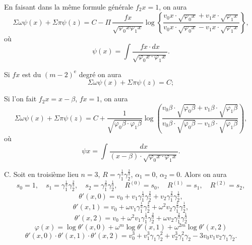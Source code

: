 \documentclass{article}
\begin{document}
En faisant dans la même formule générale $f_2 x = 1$, on aura
\[ \Sigma\omega\psi(x)+\Sigma\pi\psi(z) = C-\Pi\,\frac{f x}{\sqrt{\varphi_0 x\varphi_1 x}}\log\left\{\frac{v_0 x \cdot \sqrt{\varphi_0 x}+v_1 x \cdot \sqrt{\varphi_1 x}}{v_0 x \cdot \sqrt{\varphi_0 x}-v_1 x \cdot \sqrt{\varphi_1 x}}\right\}, \]
où
\[ \psi(x) = \int \frac{f x \cdot dx}{\sqrt{\varphi_0 x \cdot \varphi_1 x}}. \]

Si $f x$ est du $(m-2)^{\text{e}}$ degré on aura
\[ \Sigma\omega\psi(x)+\Sigma\pi\psi(z) = C; \]

Si l'on fait $f_2 x = x-\beta$, $f x = 1$, on aura
\[ \Sigma\omega\psi(x)+\Sigma\pi\psi(z) = C+\frac{1}{\sqrt{\varphi_0\beta \cdot \varphi_1\beta}}\log\left(\frac{v_0\beta \cdot \sqrt{\varphi_0\beta}+v_1\beta \cdot \sqrt{\varphi_1\beta}}{v_0\beta \cdot \sqrt{\varphi_0\beta}-v_1\beta \cdot \sqrt{\varphi_1\beta}}\right), \]
où
\[ \psi x = \int \frac{dx}{(x-\beta) \cdot \sqrt{\varphi_0 x \cdot \varphi_1 x}}. \]

C. Soit en troisième lieu $n = 3$, $R = \gamma_1^{\frac{1}{3}}\gamma_2^{\frac{2}{3}}$, $\alpha_1 = 0$, $\alpha_2 = 0$.
Alors on aura
\[ s_0 = 1, \quad s_1 = \gamma_1^{\frac{1}{3}}\gamma_2^{\frac{2}{3}}, \quad s_2 = \gamma_1^{\frac{2}{3}}\gamma_2^{\frac{1}{3}}, \quad R^{(0)} = s_0, \quad R^{(1)} = s_1, \quad R^{(2)} = s_2, \]
\[ \theta'(x,0) = v_0+v_1\gamma_1^{\frac{1}{3}}\gamma_2^{\frac{2}{3}}+v_2\gamma_1^{\frac{2}{3}}\gamma_2^{\frac{1}{3}}, \]
\[ \theta'(x,1) = v_0+\omega v_1\gamma_1^{\frac{1}{3}}\gamma_2^{\frac{2}{3}}+\omega^{2}v_2\gamma_1^{\frac{2}{3}}\gamma_2^{\frac{1}{3}}, \]
\[ \theta'(x,2) = v_0+\omega^{2}v_1\gamma_1^{\frac{1}{3}}\gamma_2^{\frac{2}{3}}+\omega v_2\gamma_1^{\frac{2}{3}}\gamma_2^{\frac{1}{3}} \]
\[ \varphi(x) = \log\theta'(x,0)+\omega^{m}\log\theta'(x,1)+\omega^{2m}\log\theta'(x,2) \]
\[ \theta'(x,0) \cdot \theta'(x,1) \cdot \theta'(x,2) = v_0^{3}+v_1^{3}\gamma_1\gamma_2^{2}+v_2^{3}\gamma_1^{2}\gamma_2-3v_0 v_1 v_2\gamma_1\gamma_2. \]
\end{document}
